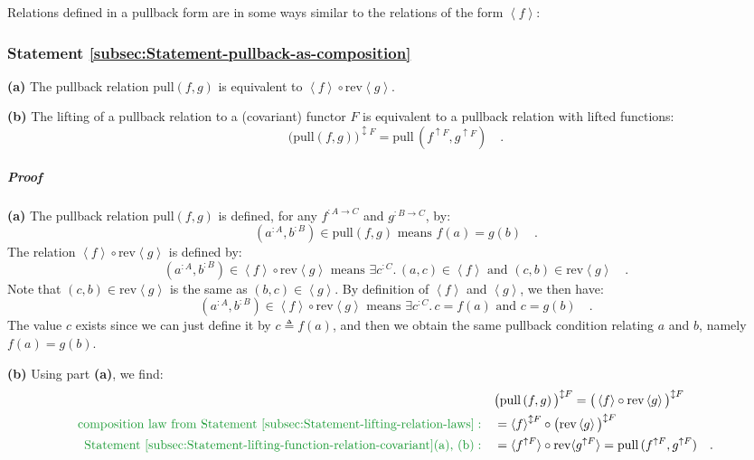 Relations defined in a pullback form are in some ways similar to the
relations of the form $\left<f\right>$:

\subsubsection{Statement \label{subsec:Statement-pullback-as-composition}\ref{subsec:Statement-pullback-as-composition}}

\textbf{(a)} The pullback relation $\text{pull}\left(f,g\right)$
is equivalent to $\left<f\right>\circ\text{rev}\left<g\right>$.

\textbf{(b)} The lifting of a pullback relation to a (covariant) functor
$F$ is equivalent to a pullback relation with lifted functions:
\[
\big(\text{pull}\left(f,g\right)\big)^{\updownarrow F}=\text{pull}\,(f^{\uparrow F},g^{\uparrow F})\quad.
\]


\subparagraph{Proof}

\textbf{(a)} The pullback relation $\text{pull}\left(f,g\right)$
is defined, for any $f^{:A\rightarrow C}$ and $g^{:B\rightarrow C}$,
by:
\[
(a^{:A},b^{:B})\in\text{pull}\left(f,g\right)\text{ means }f(a)=g(b)\quad.
\]
The relation $\left<f\right>\circ\text{rev}\left<g\right>$ is defined
by:
\[
(a^{:A},b^{:B})\in\left<f\right>\circ\text{rev}\left<g\right>\text{ means }\exists c^{:C}.\,(a,c)\in\left<f\right>\text{ and }(c,b)\in\text{rev}\left<g\right>\quad.
\]
Note that $(c,b)\in\text{rev}\left<g\right>$ is the same as $(b,c)\in\left<g\right>$.
By definition of $\left<f\right>$ and $\left<g\right>$, we then
have:
\[
(a^{:A},b^{:B})\in\left<f\right>\circ\text{rev}\left<g\right>\text{ means }\exists c^{:C}.\,c=f(a)\text{ and }c=g(b)\quad.
\]
The value $c$ exists since we can just define it by $c\triangleq f(a)$,
and then we obtain the same pullback condition relating $a$ and $b$,
namely $f(a)=g(b)$.

\textbf{(b)} Using part \textbf{(a)}, we find:
\begin{align*}
 & \big(\text{pull}\left(f,g\right)\big)^{\updownarrow F}=\big(\left<f\right>\circ\text{rev}\left<g\right>\big)^{\updownarrow F}\\
{\color{greenunder}\text{composition law from Statement~\ref{subsec:Statement-lifting-relation-laws}}:}\quad & =\left<f\right>^{\updownarrow F}\circ\big(\text{rev}\left<g\right>\big)^{\updownarrow F}\\
{\color{greenunder}\text{Statement~\ref{subsec:Statement-lifting-function-relation-covariant}(a), (b)}:}\quad & =\langle f^{\uparrow F}\rangle\circ\text{rev}\langle g^{\uparrow F}\rangle=\text{pull}\,(f^{\uparrow F},g^{\uparrow F})\quad.
\end{align*}


